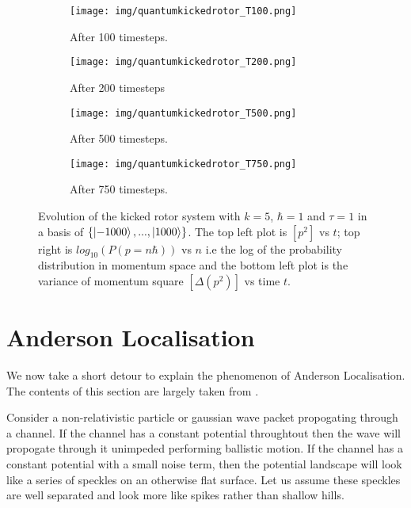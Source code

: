 \documentclass[twocolumn,nobalancelastpage]{report}
\begin{document}
\newpage
\onecolumn
\begin{figure}[H]
    \centering
    \begin{subfigure}[b]{0.5 \textwidth}
        \centering
        \texttt{[image: img/quantumkickedrotor\_T100.png]}
        \caption{After 100 timesteps.}
    \end{subfigure}%
    \begin{subfigure}[b]{0.5 \textwidth}
        \centering
        \texttt{[image: img/quantumkickedrotor\_T200.png]}
        \caption{After 200 timesteps}
    \end{subfigure}%
    \newline
    \begin{subfigure}[b]{0.5 \textwidth}
        \centering
        \texttt{[image: img/quantumkickedrotor\_T500.png]}
        \caption{After 500 timesteps.}
    \end{subfigure}%
    \begin{subfigure}[b]{0.5 \textwidth}
        \centering
        \texttt{[image: img/quantumkickedrotor\_T750.png]}
        \caption{After 750 timesteps.}
    \end{subfigure}
    \caption{Evolution of the kicked rotor system with $k = 5$, $\hbar = 1$
and $\tau = 1$ in a basis of $\{\ket{-1000},...,\ket{1000}\}$. The top
left plot is $[p^2]$ vs $t$; top right is $log_{10}(P(p = n\hbar))$ vs
$n$ i.e the log of the probability distribution in momentum space and the
bottom left plot is the variance of momentum square $[\Delta(p^2)]$ vs
time $t$.}
    \label{fig:kickedrotorplot}
\end{figure}

\twocolumn
\section{Anderson Localisation}
We now take a short detour to explain the phenomenon of Anderson Localisation.
The contents of this section are largely taken from \cite{muller_disorder_2016}.

Consider a non-relativistic particle or gaussian wave packet propogating
through a channel. If the channel has a constant potential throughtout
then the wave will propogate through it unimpeded performing ballistic
motion. If the channel has a constant potential with a small noise
term, then the potential landscape will look like a series of speckles
on an otherwise flat surface. Let us assume these speckles are well
separated and look more like spikes rather than shallow hills.
\end{document}
